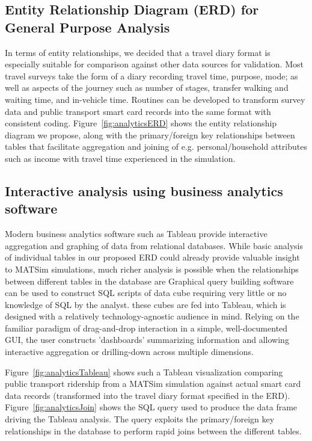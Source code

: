 \subsection{Entity Relationship Diagram (ERD) for General Purpose Analysis}

In terms of entity relationships, we decided that a travel diary format is especially suitable for comparison against other data sources for validation. Most travel surveys take the form of a diary recording travel time, purpose, mode; as well as aspects of the journey such as number of stages, transfer walking and waiting time, and in-vehicle time. Routines can be developed to transform survey data  and public transport smart card records into the same format with consistent coding. Figure~\ref{fig:analyticsERD} shows the entity relationship diagram  we propose, along with the primary/foreign key relationships between tables that facilitate aggregation and joining of e.g. personal/household attributes such as income with travel time experienced in the simulation.

\subsection{Interactive analysis using business analytics software}
Modern business analytics software such as Tableau \citep{Tableau_Webpage_2013} provide interactive aggregation and graphing of data from relational databases. While basic analysis of individual tables in our proposed ERD could already provide valuable insight to MATSim simulations, much richer analysis is possible when the relationships between different tables in the database are Graphical query building software can be used to construct SQL scripts of data cube requiring very little or no knowledge of SQL by the analyst. these cubes are fed into Tableau, which is designed with a relatively technology-agnostic audience in mind. Relying on the familiar paradigm of drag-and-drop interaction in a simple, well-documented GUI, the user constructs 'dashboards' summarizing information and allowing interactive aggregation or drilling-down across multiple dimensions.

Figure~\ref{fig:analyticsTableau} shows such a Tableau visualization comparing public transport ridership from a MATSim simulation against actual smart card data records (transformed into the travel diary format specified in the ERD). Figure~\ref{fig:analyticsJoin} shows the SQL query used to produce the data frame driving the Tableau analysis. The query exploits the primary/foreign key relationships in the database to perform rapid joins between the different tables.


